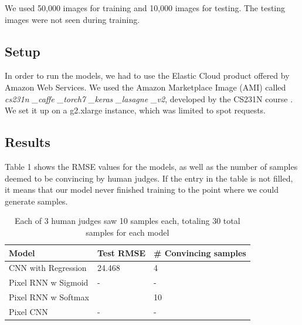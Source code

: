 \documentclass[10pt,twocolumn,letterpaper]{article}
\begin{document}
We used 50,000 images for training and 10,000 images for testing. The testing images were not seen during training.

\subsection{Setup}
In order to run the models, we had to use the Elastic Cloud product offered by Amazon Web Services. We used the Amazon Marketplace Image (AMI) called \textit{cs231n \_caffe \_torch7 \_keras \_lasagne \_v2}, developed by the CS231N course \cite{aws_tutorial}. We set it up on a g2.xlarge instance, which was limited to spot requests. 

\subsection{Results}
Table 1 shows the RMSE values for the models, as well as the number of samples deemed to be convincing by human judges. If the entry in the table is not filled, it means that our model never finished training to the point where we could generate samples.
\begin{table}[!ht]
\centering
\caption{Each of 3 human judges saw 10 samples each, totaling 30 total samples for each model}
\begin{tabular}{lll}
\hline
Model               & Test RMSE & \# Convincing samples \\ \hline
CNN with Regression & 24.468    &  4                     \\
Pixel RNN w Sigmoid &   -       &  -                     \\
Pixel RNN w Softmax &           &  10                     \\
Pixel CNN           &   -       &  -                     \\ \hline
\end{tabular}
\end{table}
\end{document}
